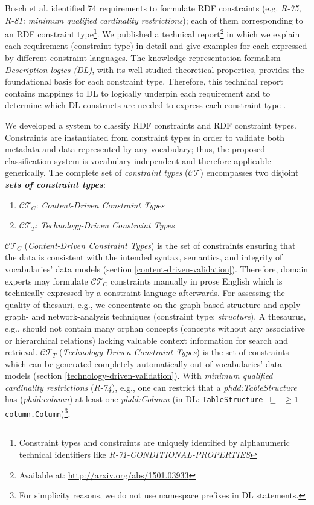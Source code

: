 \documentclass{llncs}
\newcommand{\ms}[1]{\texttt{#1}}
\begin{document}
Bosch et al. identified 74 requirements to formulate RDF constraints (e.g. \emph{R-75, R-81: minimum qualified cardinality restrictions}); each of them corresponding to an RDF constraint type\footnote{Constraint types and constraints are uniquely identified by alphanumeric technical identifiers like \emph{R-71-CONDITIONAL-PROPERTIES}}\cite{BoschNolleAcarEckert2015}. 
We published a technical report\footnote{Available at: \url{http://arxiv.org/abs/1501.03933}} in which we explain each requirement (constraint type) in detail and give examples for each expressed by different constraint languages.
The knowledge representation formalism \emph{Description logics (DL)}, with its  well-studied theoretical properties, provides the foundational basis for each constraint type.
Therefore, this technical report contains mappings to DL to logically underpin each requirement and to determine which DL constructs are needed to express each constraint type \cite{BoschNolleAcarEckert2015}.

We developed a system to classify RDF constraints and RDF constraint types.
Constraints are instantiated from constraint types in order to validate both metadata and data represented by any vocabulary; thus, the proposed classification system is vocabulary-independent and therefore applicable generically.
The complete set of \emph{constraint types} ($\mathcal{CT}$) encompasses two disjoint \textbf{\emph{sets of constraint types}}:
\begin{enumerate}
	\item $\mathcal{CT}_{C}$: \emph{Content-Driven Constraint Types}
	\item $\mathcal{CT}_{T}$: \emph{Technology-Driven Constraint Types}
\end{enumerate}

$\mathcal{CT}_{C}$ (\emph{Content-Driven Constraint Types}) is the set of constraints ensuring that the data is consistent with the intended syntax, semantics, and integrity of vocabularies' data models (section \ref{content-driven-validation}). 
Therefore, domain experts may formulate $\mathcal{CT}_{C}$ constraints manually in prose English which is technically expressed by a constraint language afterwards.
For assessing the quality of thesauri, e.g., we concentrate on the graph-based structure and apply graph- and network-analysis techniques (constraint type: \emph{structure}). 
A thesaurus, e.g., should not contain many orphan concepts (concepts without any associative or hierarchical relations) lacking valuable context information for search and retrieval.  
$\mathcal{CT}_{T}$ (\emph{Technology-Driven Constraint Types}) is the set of constraints which can be generated completely automatically out of vocabularies' data models (section \ref{technology-driven-validation}).
With \emph{minimum qualified cardinality restrictions} (\emph{R-74}), e.g., one can restrict that
a \emph{phdd:TableStructure} has (\emph{phdd:column}) at least one \emph{phdd:Column} (in DL: \ms{TableStructure $\sqsubseteq$ $\geq$1 column.Column})\footnote{For simplicity reasons, we do not use namespace prefixes in DL statements.}.
\end{document}
